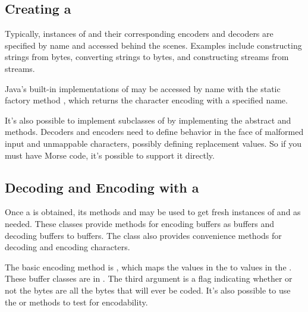 \subsection{Creating a }

Typically, instances of  and their corresponding
encoders and decoders are specified by name and accessed behind the
scenes.  Examples include constructing strings from bytes, converting
strings to bytes, and constructing  streams from
 streams.

Java's built-in implementations of  may be accessed by
name with the static factory method ,
which returns the character encoding with a specified name.  

It's also possible to implement subclasses of  by
implementing the abstract  and 
methods.  Decoders and encoders need to define behavior in the face of
malformed input and unmappable characters, possibly defining
replacement values. So if you must have Morse code, it's possible to
support it directly.  

\subsection{Decoding and Encoding with a }

Once a  is obtained, its methods  and
 may be used to get fresh instances of
 and  as needed. These classes
provide methods for encoding  buffers as 
buffers and decoding  buffers to  buffers.  The
 class also provides convenience methods for decoding
and encoding characters.

The basic encoding method is
, which maps the
 values in the  to  values in
the .  These buffer classes are in .
The third argument is a flag indicating whether or not the bytes are
all the bytes that will ever be coded.  It's also possible to use the
 or  methods to
test for encodability.  

